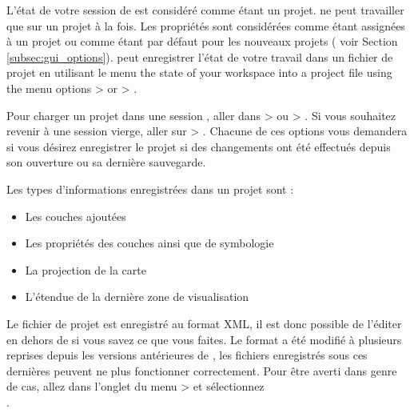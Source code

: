 L'état de votre session de \qg est considéré comme étant un projet. \qg ne peut travailler que sur un projet à la fois. Les propriétés sont considérées comme étant assignées à un projet ou comme étant par défaut pour les nouveaux projets ( voir Section \ref{subsec:gui_options}). \qg peut enregistrer l'état de votre travail dans un fichier de projet en utilisant le menu the state of your 
workspace into a project file using the menu options 
 > 
or  > .

Pour charger un projet dans une session \qg, aller dans  >  ou  > . Si vous souhaitez revenir à une session vierge, aller sur  > .
Chacune de ces options vous demandera si vous désirez enregistrer le projet si des changements ont été effectués depuis son ouverture ou sa dernière sauvegarde.

Les types d'informations enregistrées dans un projet sont :

\begin{itemize}[label=--]
\item Les couches ajoutées
\item Les propriétés des couches ainsi que de symbologie
\item La projection de la carte
\item L'étendue de la dernière zone de visualisation
\end{itemize}

Le fichier de projet est enregistré au format XML, il est donc possible de l'éditer en dehors de \qg si vous savez ce que vous faites. Le format a été modifié à plusieurs reprises depuis les versions antérieures de \qg, les fichiers enregistrés sous ces dernières peuvent ne plus fonctionner correctement. Pour être averti dans genre de cas, allez dans l'onglet  du menu  >  et sélectionnez\\ .

